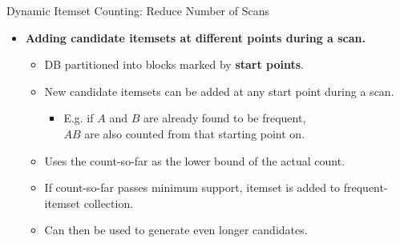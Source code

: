 \begin{frame}{Dynamic Itemset Counting: Reduce Number of Scans}
	\begin{itemize}
		\item \textbf{Adding candidate itemsets at different points during a
			      scan.}
		      \begin{itemize}
			      \item DB partitioned into blocks marked by
			            \textbf{\color{airforceblue}start points}.
			      \item New candidate itemsets can be added at any start point during
			            a scan.
			            \begin{itemize}
				            \item E.g. if $A$ and $B$ are already found to be frequent, \\
				                  $AB$ are also counted from that starting point on.
			            \end{itemize}
			      \item Uses the count-so-far as the lower bound of the actual count.
			      \item If count-so-far passes minimum support, itemset is added to
			            frequent-itemset collection.
			      \item Can then be used to generate even longer candidates.
		      \end{itemize}
	\end{itemize}
\end{frame}

